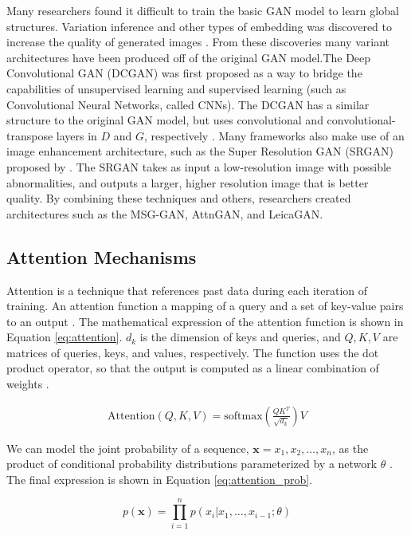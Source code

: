 \documentclass[letterpaper]{article} %
\begin{document}
Many researchers found it difficult to train the basic GAN model to learn 
global  structures. Variation inference and other types of embedding was 
discovered to increase the quality of generated images \cite{varigan}. From 
these discoveries many variant architectures have been produced off of the 
original GAN model.The Deep Convolutional GAN (DCGAN)
was first proposed as a way to bridge the capabilities of unsupervised learning 
and supervised learning (such as Convolutional Neural Networks, called CNNs). 
The DCGAN has a similar structure to the original GAN model, but uses 
convolutional and convolutional-transpose layers in $D$ and $G$, respectively
\cite{unsupervised_learning}. Many frameworks also make use of an image 
enhancement architecture, such as the  Super Resolution GAN (SRGAN) proposed by 
\cite{srgan}. The SRGAN takes as input a low-resolution image with possible 
abnormalities, and outputs a larger, higher resolution image that is better 
quality. By combining these techniques and others, researchers created 
architectures such as the MSG-GAN, AttnGAN, and LeicaGAN.

\subsection{Attention Mechanisms}
Attention is a technique that references past data during each iteration of 
training. An attention function a mapping of a query and a
set of key-value pairs to an output \cite{attention_need}.
The mathematical expression of the attention function is shown in
Equation \ref{eq:attention}.
$d_k$ is the dimension of keys and queries, and
$Q,K,V$ are matrices of queries, keys, and values, respectively.
The function uses the dot product operator, so that the output is computed as
a linear combination of weights \cite{attention_need}.

\begin{equation}
\label{eq:attention}
\begin{split}
\text{Attention}(Q,K,V) = \text{softmax}(\frac{QK^T}{\sqrt{d_k}})V
\end{split}
\end{equation}

We can model the joint probability of a sequence,
$\mathbf{x}={x_1,x_2,\dots,x_n}$,
as the product of conditional
probability distributions parameterized by a network $\theta$
\cite{generative_transformers}.
The final expression is shown in Equation \ref{eq:attention_prob}.

\begin{equation}
\label{eq:attention_prob}
p(\mathbf{x}) = \prod_{i=1}^{n}p(x_i|x_1,\dots,x_{i-1};\theta)
\end{equation}
\end{document}
